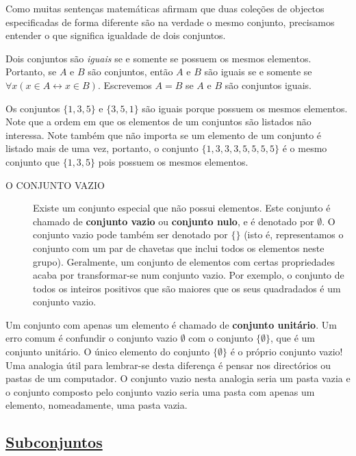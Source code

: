 Como muitas sentenças matemáticas afirmam que duas coleções de
objectos especificadas de forma diferente são na verdade o mesmo
conjunto, precisamos entender o que significa igualdade de dois
conjuntos.

\label{def32}
\begin{defn}
Dois conjuntos são \emph{iguais} se e somente se possuem os mesmos elementos.
Portanto, se $A$ e $B$ são conjuntos, então $A$ e $B$ são iguais se e somente se
$\forall x (x \in A \leftrightarrow x \in B)$. Escrevemos $A = B$ se $A$ e $B$
são conjuntos iguais.
\end{defn}

\label{exem36}
\begin{exmp}
Os conjuntos $\{1,3,5\}$ e $\{3,5,1\}$ são iguais porque possuem os mesmos
elementos. Note que a ordem em que os elementos de um conjuntos são listados não
interessa. Note também que não importa se um elemento de um conjunto é listado
mais de uma vez, portanto, o conjunto $\{1,3,3,3,5,5,5,5\}$ é o mesmo conjunto
que $\{1,3,5\}$ pois possuem os mesmos elementos.
\end{exmp}

\begin{description}
\item[O CONJUNTO VAZIO] Existe um conjunto especial que não possui elementos.
Este conjunto é chamado de \textbf{conjunto vazio} ou \textbf{conjunto nulo}, e
é denotado por $\emptyset$. O conjunto vazio pode também ser denotado por $\{
\}$ (isto é, representamos o conjunto com um par de chavetas que inclui todos
os elementos neste grupo). Geralmente, um conjunto de elementos com certas
propriedades acaba por transformar-se num conjunto vazio. Por exemplo, o
conjunto de todos os inteiros positivos que são maiores que os seus quadradados
é um conjunto vazio.
\end{description}

Um conjunto com apenas um elemento é chamado de \textbf{conjunto unitário}. Um
erro comum é confundir o conjunto vazio $\emptyset$ com o conjunto
$\{\emptyset\}$, que é um conjunto unitário. O único elemento do conjunto
$\{\emptyset\}$ é o próprio conjunto vazio! Uma analogia útil para lembrar-se
desta diferença é pensar nos directórios ou pastas de um computador. O conjunto
vazio nesta analogia seria um pasta vazia e o conjunto composto pelo conjunto
vazio seria uma pasta com apenas um elemento, nomeadamente, uma pasta vazia.

\subsection*{\underline{Subconjuntos}}

